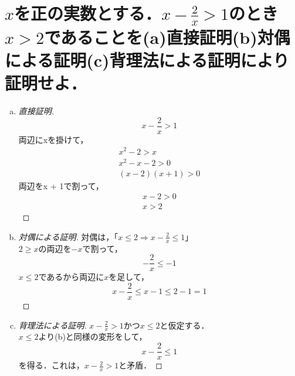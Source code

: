 \documentclass[a4paper,12pt]{ltjsarticle}
\begin{document}
\section{$x$を正の実数とする．$x - \frac{2}{x} > 1$のとき$x > 2$であることを(a)直接証明(b)対偶による証明(c)背理法による証明により証明せよ．}
\begin{enumerate}[(a)]
    \item
        \begin{proof}[直接証明]
            \begin{equation*}
                x - \frac{2}{x} > 1
            \end{equation*}
            両辺にxを掛けて，
            \begin{gather*}
                x^2 - 2 > x \\
                x^2 - x - 2 > 0 \\
                (x - 2)(x + 1) > 0
            \end{gather*}
            両辺をx + 1で割って，
            \begin{gather*}
                x - 2 > 0 \\
                x > 2
            \end{gather*}
        \end{proof}
    \item
        \begin{proof}[対偶による証明]
            対偶は，「$x \leq 2 \Rightarrow x - \frac{2}{x} \leq 1$」 \\
            $2 \geq x$の両辺を$-x$で割って，
            \begin{equation*}
                -\frac{2}{x} \leq -1
            \end{equation*}
            $x \leq 2$であるから両辺に$x$を足して，
            \begin{equation*}
                x - \frac{2}{x} \leq x - 1 \leq 2 - 1 = 1
            \end{equation*}
        \end{proof}
    \item
        \begin{proof}[背理法による証明]
            $x - \frac{2}{x} > 1$かつ$x \leq 2$と仮定する． \\
            $x \leq 2$より(b)と同様の変形をして，
            \begin{equation*}
                x - \frac{2}{x} \leq 1
            \end{equation*}
            を得る．これは，$x - \frac{2}{x} > 1$と矛盾．
        \end{proof}
\end{enumerate}
\end{document}

